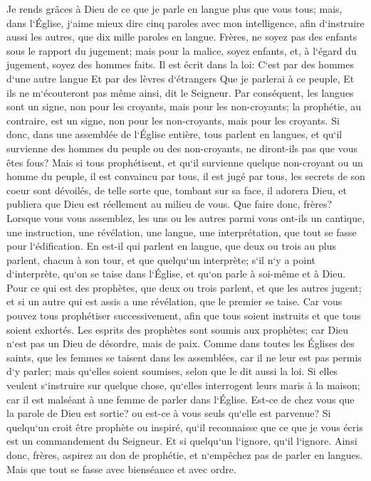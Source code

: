 \verse Je rends grâces à Dieu de ce que je parle en langue plus que vous tous; 
\verse mais, dans l`Église, j`aime mieux dire cinq paroles avec mon intelligence, afin d`instruire aussi les autres, que dix mille paroles en langue. 
\verse Frères, ne soyez pas des enfants sous le rapport du jugement; mais pour la malice, soyez enfants, et, à l`égard du jugement, soyez des hommes faits. 
\verse Il est écrit dans la loi: C`est par des hommes d`une autre langue Et par des lèvres d`étrangers Que je parlerai à ce peuple, Et ils ne m`écouteront pas même ainsi, dit le Seigneur. 
\verse Par conséquent, les langues sont un signe, non pour les croyants, mais pour les non-croyants; la prophétie, au contraire, est un signe, non pour les non-croyants, mais pour les croyants. 
\verse Si donc, dans une assemblée de l`Église entière, tous parlent en langues, et qu`il survienne des hommes du peuple ou des non-croyants, ne diront-ils pas que vous êtes fous? 
\verse Mais si tous prophétisent, et qu`il survienne quelque non-croyant ou un homme du peuple, il est convaincu par tous, il est jugé par tous, 
\verse les secrets de son coeur sont dévoilés, de telle sorte que, tombant sur sa face, il adorera Dieu, et publiera que Dieu est réellement au milieu de vous. 
\verse Que faire donc, frères? Lorsque vous vous assemblez, les uns ou les autres parmi vous ont-ils un cantique, une instruction, une révélation, une langue, une interprétation, que tout se fasse pour l`édification. 
\verse En est-il qui parlent en langue, que deux ou trois au plus parlent, chacun à son tour, et que quelqu`un interprète; 
\verse s`il n`y a point d`interprète, qu`on se taise dans l`Église, et qu`on parle à soi-même et à Dieu. 
\verse Pour ce qui est des prophètes, que deux ou trois parlent, et que les autres jugent; 
\verse et si un autre qui est assis a une révélation, que le premier se taise. 
\verse Car vous pouvez tous prophétiser successivement, afin que tous soient instruits et que tous soient exhortés. 
\verse Les esprits des prophètes sont soumis aux prophètes; 
\verse car Dieu n`est pas un Dieu de désordre, mais de paix. Comme dans toutes les Églises des saints, 
\verse que les femmes se taisent dans les assemblées, car il ne leur est pas permis d`y parler; mais qu`elles soient soumises, selon que le dit aussi la loi. 
\verse Si elles veulent s`instruire sur quelque chose, qu`elles interrogent leurs maris à la maison; car il est malséant à une femme de parler dans l`Église. 
\verse Est-ce de chez vous que la parole de Dieu est sortie? ou est-ce à vous seuls qu`elle est parvenue? 
\verse Si quelqu`un croit être prophète ou inspiré, qu`il reconnaisse que ce que je vous écris est un commandement du Seigneur. 
\verse Et si quelqu`un l`ignore, qu`il l`ignore. 
\verse Ainsi donc, frères, aspirez au don de prophétie, et n`empêchez pas de parler en langues. 
\verse Mais que tout se fasse avec bienséance et avec ordre. 

